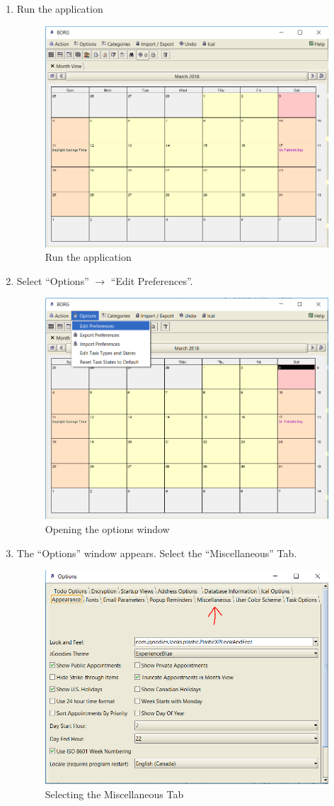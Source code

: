 \documentclass[fontsize=12pt,paper=letter,twoside]{scrartcl}
\begin{document}
\begin{itemize}
\begin{itemize}
\begin{enumerate}
\item{Run the application}
\begin{figure}[!htb]
\begin{center}
\includegraphics[width=.5\textwidth]{images/bbt/bvt-step1.png}
\end{center}
\caption{Run the application}
\label{fig:bbt_bvtstep1}
\end{figure}

\item{Select ``Options'' $\to$ ``Edit Preferences''.}
\begin{figure}[!htb]
\begin{center}
\includegraphics[width=.5\textwidth]{images/bbt/bvt-step2.png}
\end{center}
\caption{Opening the options window}
\label{fig:bbt_bvtstep2}
\end{figure}
\newpage
\item{The ``Options'' window appears. Select the ``Miscellaneous'' Tab.}
\begin{figure}[!htb]
\begin{center}
\includegraphics[width=.5\textwidth]{images/bbt/bvt-step3.png}
\end{center}
\caption{Selecting the Miscellaneous Tab}
\label{fig:bbt_bvtstep3}
\end{figure}


\end{enumerate}
\end{itemize}
\end{itemize}
\end{document}
